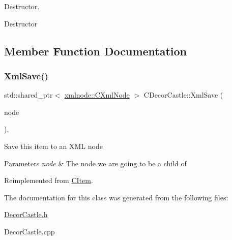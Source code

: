 Destructor. 

Destructor 

\subsection{Member Function Documentation}
\mbox{\label{class_c_decor_castle_a83ecb7c898679e55dcafbc6492bc38d0}} 
\subsubsection{\texorpdfstring{Xml\+Save()}{XmlSave()}}
{\footnotesize\ttfamily std\+::shared\+\_\+ptr$<$ \mbox{\hyperlink{classxmlnode_1_1_c_xml_node}{xmlnode\+::\+C\+Xml\+Node}} $>$ C\+Decor\+Castle\+::\+Xml\+Save (\begin{DoxyParamCaption}\item[{const std\+::shared\+\_\+ptr$<$ \mbox{\hyperlink{classxmlnode_1_1_c_xml_node}{xmlnode\+::\+C\+Xml\+Node}} $>$ \&}]{node }\end{DoxyParamCaption})\hspace{0.3cm}{\ttfamily [override]}, {\ttfamily [virtual]}}

Save this item to an X\+ML node 
\begin{DoxyParams}{Parameters}
{\em node} & The node we are going to be a child of \\
\hline
\end{DoxyParams}


Reimplemented from \mbox{\hyperlink{class_c_item_a10584fa8e05d3abe125f95f0ceecdedd}{C\+Item}}.



The documentation for this class was generated from the following files\+:\begin{DoxyCompactItemize}
\item 
\mbox{\hyperlink{_decor_castle_8h}{Decor\+Castle.\+h}}\item 
Decor\+Castle.\+cpp\end{DoxyCompactItemize}
